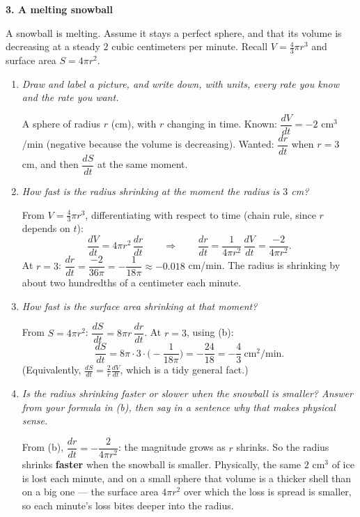 \documentclass[11pt]{article}
\newcommand{\q}[1]{{\color{gray!55!black}\itshape #1}\par\smallskip}
\newenvironment{statement}{\par\color{gray!55!black}}{\par\medskip}
\newcommand{\prob}[1]{\bigskip\noindent\textbf{\large #1}\par\smallskip}
\begin{document}
\newpage
\prob{3. A melting snowball}

\begin{statement}
A snowball is melting. Assume it stays a perfect sphere, and that its volume is decreasing at a steady $2$ cubic centimeters per minute. Recall $V=\frac43\pi r^3$ and surface area $S=4\pi r^2$.
\end{statement}
\begin{enumerate}
\item \q{Draw and label a picture, and write down, with units, every rate you know and the rate you want.}
A sphere of radius $r$ (cm), with $r$ changing in time. Known: $\dfrac{dV}{dt}=-2$
cm$^3$/min (negative because the volume is decreasing). Wanted: $\dfrac{dr}{dt}$ when
$r=3$ cm, and then $\dfrac{dS}{dt}$ at the same moment.

\item \q{How fast is the radius shrinking at the moment the radius is $3$ cm?}
From $V=\frac43\pi r^3$, differentiating with respect to time (chain rule, since
$r$ depends on $t$):
\[
\frac{dV}{dt} = 4\pi r^2\,\frac{dr}{dt}
\qquad\Longrightarrow\qquad
\frac{dr}{dt} = \frac{1}{4\pi r^2}\,\frac{dV}{dt} = \frac{-2}{4\pi r^2}.
\]
At $r=3$: $\dfrac{dr}{dt} = \dfrac{-2}{36\pi} = -\dfrac{1}{18\pi}\approx -0.018$ cm/min.
The radius is shrinking by about two hundredths of a centimeter each minute.

\item \q{How fast is the surface area shrinking at that moment?}
From $S=4\pi r^2$: $\dfrac{dS}{dt} = 8\pi r\,\dfrac{dr}{dt}$. At $r=3$, using (b):
\[
\frac{dS}{dt} = 8\pi\cdot3\cdot\Big(-\frac{1}{18\pi}\Big) = -\frac{24}{18} = -\frac43
\ \text{cm}^2\text{/min.}
\]
(Equivalently, $\frac{dS}{dt} = \frac{2}{r}\frac{dV}{dt}$, which is a tidy general fact.)

\item \q{Is the radius shrinking faster or slower when the snowball is smaller? Answer from your formula in (b), then say in a sentence why that makes physical sense.}
From (b), $\dfrac{dr}{dt} = -\dfrac{2}{4\pi r^2}$: the magnitude grows as $r$
shrinks. So the radius shrinks \textbf{faster} when the snowball is smaller. Physically,
the same $2$ cm$^3$ of ice is lost each minute, and on a small sphere that volume is a
thicker shell than on a big one --- the surface area $4\pi r^2$ over which the loss is
spread is smaller, so each minute's loss bites deeper into the radius.
\end{enumerate}
\end{document}
